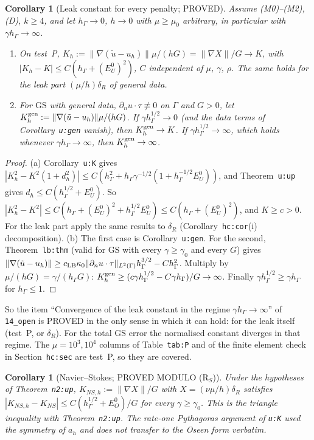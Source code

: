 \documentclass[11pt]{article}
\newtheorem{corollary}[theorem]{Corollary}
\theoremstyle{definition}
\theoremstyle{remark}
\newcommand{\hG}{h_\Gamma}
\newcommand{\norm}[1]{\|#1\|}
\newcommand{\dn}{\partial_n}
\newcommand{\ut}{\tilde u}
\newcommand{\GS}{\mathrm{GS}}
\begin{document}
\begin{corollary}[Leak constant for every penalty; PROVED]\label{cor:K}
Assume (M0)--(M2), (D), $k\ge4$, and let $\hG\to0$, $h\to0$ with $\mu\ge\mu_0$ arbitrary, in particular with $\gamma\hG\to\infty$.
\begin{enumerate}[label=(\alph*)]
\item On test~P, $K_h:=\norm{\nabla(\ut-u_h)}\mu/(hG)=\norm{\nabla X}/G\to K$, with $|K_h-K|\le C(\hG+(E^0_U)^2)$, $C$ independent of $\mu$, $\gamma$, $\rho$.
The same holds for the leak part $(\mu/h)\delta_R$ of general data.
\item For $\GS$ with general data, $\dn u\cdot\tau\not\equiv0$ on $\Gamma$ and $G>0$, let $K^{\rm gen}_h:=\norm{\nabla(\ut-u_h)}\mu/(hG)$. If $\gamma\hG^{1/2}\to0$ (and the data terms of Corollary~\texttt{u:gen} vanish), then $K^{\rm gen}_h\to K$. If $\gamma\hG^{1/2}\to\infty$, which holds whenever $\gamma\hG\to\infty$, then $K^{\rm gen}_h\to\infty$.
\end{enumerate}
\end{corollary}
\begin{proof}
(a) Corollary~\texttt{u:K} gives $|K_h^2-K^2(1+d_h^2)|\le C(\hG^2+\hG\gamma^{-1/2}(1+\hG^{-1/2}E^0_U))$, and Theorem~\texttt{u:up} gives $d_h\le C(\hG^{1/2}+E^0_U)$. So $|K_h^2-K^2|\le C(\hG+(E^0_U)^2+\hG^{1/2}E^0_U)\le C(\hG+(E^0_U)^2)$, and $K\ge c>0$. For the leak part apply the same results to $\delta_R$ (Corollary~\texttt{hc:cor}(i) decomposition).
(b) The first case is Corollary~\texttt{u:gen}. For the second, Theorem~\texttt{lb:thm} (valid for $\GS$ with every $\gamma\ge\gamma_0$ and every $G$) gives $\norm{\nabla(\ut-u_h)}\ge c_{\rm LB}\kappa_0\norm{\dn u\cdot\tau}_{L^2(\Gamma)}\hG^{3/2}-C\hG^2$. Multiply by $\mu/(hG)=\gamma/(\hG G)$: $K^{\rm gen}_h\ge(c\gamma\hG^{1/2}-C\gamma\hG)/G\to\infty$. Finally $\gamma\hG^{1/2}\ge\gamma\hG$ for $\hG\le1$.
\end{proof}
So the item ``Convergence of the leak constant in the regime $\gamma\hG\to\infty$'' of \texttt{14\_open} is PROVED in the only sense in which it can hold: for the leak itself (test~P, or $\delta_R$). For the total $\GS$ error the normalised constant diverges in that regime. The $\mu=10^3,10^4$ columns of Table~\texttt{tab:P} and of the finite element check in Section~\texttt{hc:sec} are test~P, so they are covered.

\begin{corollary}[Navier--Stokes; PROVED MODULO (R$_S$)]
Under the hypotheses of Theorem~\texttt{n2:up}, $K_{NS,h}:=\norm{\nabla X}/G$ with $X=(\nu\mu/h)\delta_R$ satisfies $|K_{NS,h}-K_{NS}|\le C(\hG^{1/2}+E^0_O)/G$ for every $\gamma\ge\gamma_0$. This is the triangle inequality with Theorem~\texttt{n2:up}. The rate-one Pythagoras argument of \texttt{u:K} used the symmetry of $a_h$ and does not transfer to the Oseen form verbatim.
\end{corollary}
\end{document}
